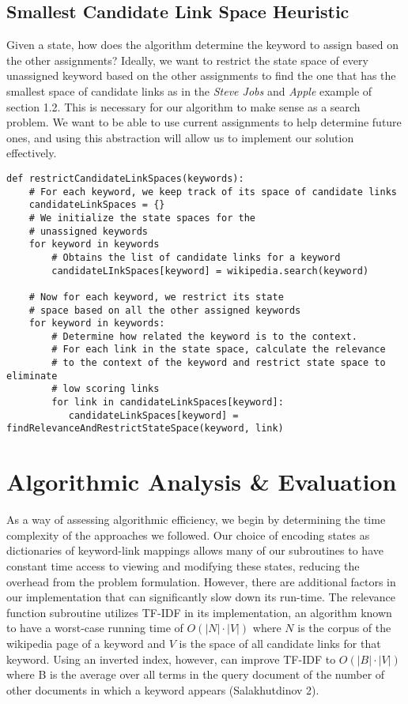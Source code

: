 \documentclass[twoside,11pt]{article}
\begin{document}
\subsection{Smallest Candidate Link Space Heuristic}

Given a state, how does the algorithm determine the keyword to assign based on the other assignments? Ideally, we want to restrict the state space of every unassigned keyword based on the other assignments to find the one that has the smallest space of candidate links as in the \textit{Steve Jobs} and \textit{Apple} example of section 1.2. This is necessary for our algorithm to make sense as a search problem. We want to be able to use current assignments to help determine future ones, and using this abstraction will allow us to implement our solution effectively.

\begin{lstlisting}
def restrictCandidateLinkSpaces(keywords):
    # For each keyword, we keep track of its space of candidate links
    candidateLinkSpaces = {}
    # We initialize the state spaces for the
    # unassigned keywords
    for keyword in keywords
        # Obtains the list of candidate links for a keyword
        candidateLInkSpaces[keyword] = wikipedia.search(keyword)

    # Now for each keyword, we restrict its state
    # space based on all the other assigned keywords
    for keyword in keywords:
        # Determine how related the keyword is to the context.
        # For each link in the state space, calculate the relevance
        # to the context of the keyword and restrict state space to eliminate
        # low scoring links
        for link in candidateLinkSpaces[keyword]:
           candidateLinkSpaces[keyword] =  findRelevanceAndRestrictStateSpace(keyword, link)

\end{lstlisting}



\section{Algorithmic Analysis \& Evaluation}

As a way of assessing algorithmic efficiency, we begin by determining the time complexity of the approaches we followed. Our  choice of encoding states as dictionaries of keyword-link mappings allows many of our subroutines to have constant time access to viewing and modifying these states, reducing the overhead from the problem formulation. However, there are additional factors in our implementation that can significantly slow down its run-time. The relevance function subroutine utilizes TF-IDF in its implementation, an algorithm known to have a worst-case running time of $O(|N|\cdot|V|)$ where $N$ is the corpus of the wikipedia page of a keyword and $V$ is the space of all candidate links for that keyword. Using an inverted index, however, can improve TF-IDF to $O(|B|\cdot|V|)$ where B is the average over all terms in the query document of the number of other documents in which a keyword appears (Salakhutdinov 2).
\end{document}
